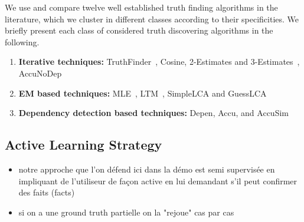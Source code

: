 We use and compare twelve well established truth finding algorithms in the literature,
which we cluster in different classes according to their specificities.
We briefly present each class of considered truth discovering algorithms in the following.

\begin{enumerate}
 \item \textbf{Iterative techniques:} TruthFinder~\cite{YinHY08}, Cosine, 2-Estimates and 3-Estimates~\cite{GallandAMS10}, 
 AccuNoDep~\cite{DongBS09}
 \item \textbf{EM based techniques:} MLE~\cite{WangKLA12}, LTM~\cite{ZhaoRGH12}, SimpleLCA and GuessLCA~\cite{PasternackR13}
 \item \textbf{Dependency detection based techniques:} Depen, Accu, and AccuSim~\cite{DongBS09}
\end{enumerate}



\subsection{Active Learning Strategy}
\begin{itemize}
 \item notre approche que l'on défend ici dans la démo est  semi supervisée en impliquant de l'utiliseur de façon active
en lui demandant s'il peut confirmer des faits (facts)
\item si on a une ground truth partielle on la "rejoue" cas par cas
\end{itemize}

